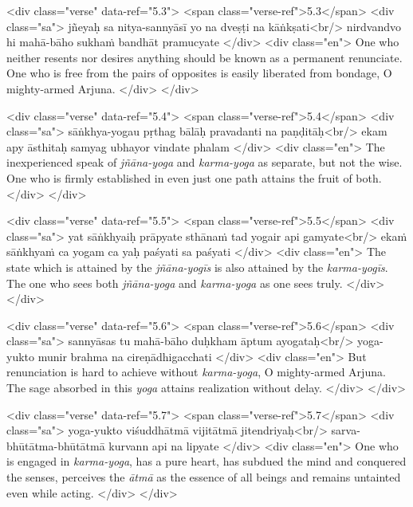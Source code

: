 \begin{html}
<div class="verse" data-ref="5.3">
  <span class="verse-ref">5.3</span>
  <div class="sa">
    jñeyaḥ sa nitya-sannyāsī yo na dveṣṭi na kāṅkṣati<br/>
    nirdvandvo hi mahā-bāho sukhaṁ bandhāt pramucyate
  </div>
  <div class="en">
    One who neither resents nor desires anything should be known as a permanent renunciate. One who is free from the pairs of opposites is easily liberated from bondage, O mighty-armed Arjuna.
  </div>
</div>
\end{html}



\begin{html}
<div class="verse" data-ref="5.4">
  <span class="verse-ref">5.4</span>
  <div class="sa">
    sāṅkhya-yogau pṛthag bālāḥ pravadanti na paṇḍitāḥ<br/>
    ekam apy āsthitaḥ samyag ubhayor vindate phalam
  </div>
  <div class="en">
    The inexperienced speak of \textit{jñāna-yoga} and \textit{karma-yoga} as separate, but not the wise. One who is firmly established in even just one path attains the fruit of both.
  </div>
</div>
\end{html}



\begin{html}
<div class="verse" data-ref="5.5">
  <span class="verse-ref">5.5</span>
  <div class="sa">
    yat sāṅkhyaiḥ prāpyate sthānaṁ tad yogair api gamyate<br/>
    ekaṁ sāṅkhyaṁ ca yogam ca yaḥ paśyati sa paśyati
  </div>
  <div class="en">
    The state which is attained by the \textit{jñāna-yogīs} is also attained by the \textit{karma-yogīs}. The one who sees both \textit{jñāna-yoga} and \textit{karma-yoga} as one sees truly.
  </div>
</div>
\end{html}



\begin{html}
<div class="verse" data-ref="5.6">
  <span class="verse-ref">5.6</span>
  <div class="sa">
    sannyāsas tu mahā-bāho duḥkham āptum ayogataḥ<br/>
    yoga-yukto munir brahma na cireṇādhigacchati
  </div>
  <div class="en">
    But renunciation is hard to achieve without \textit{karma-yoga}, O mighty-armed Arjuna. The sage absorbed in this \textit{yoga} attains realization without delay.
  </div>
</div>
\end{html}



\begin{html}
<div class="verse" data-ref="5.7">
  <span class="verse-ref">5.7</span>
  <div class="sa">
    yoga-yukto viśuddhātmā vijitātmā jitendriyaḥ<br/>
    sarva-bhūtātma-bhūtātmā kurvann api na lipyate
  </div>
  <div class="en">
    One who is engaged in \textit{karma-yoga}, has a pure heart, has subdued the mind and conquered the senses, perceives the \textit{ātmā} as the essence of all beings and remains untainted even while acting.
  </div>
</div>
\end{html}


